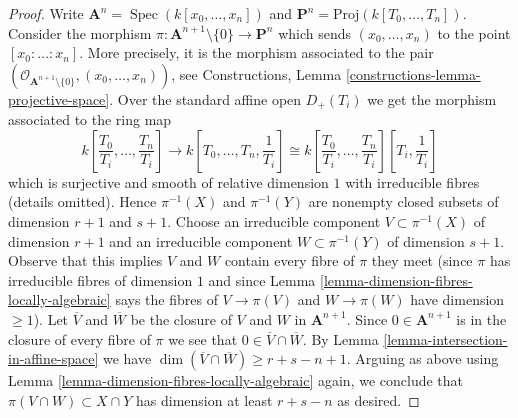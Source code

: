 \documentclass[10pt,a4paper]{amsart}
\theoremstyle{plain}
\theoremstyle{definition}
\theoremstyle{remark}
\numberwithin{equation}{subsection}
\def\Spec{\mathop{\mathrm{Spec}}}
\begin{document}
\begin{proof}
Write $\mathbf{A}^n = \Spec(k[x_0, \ldots, x_n])$ and
$\mathbf{P}^n = \text{Proj}(k[T_0, \ldots, T_n])$.
Consider the morphism
$\pi : \mathbf{A}^{n + 1} \setminus \{0\} \to \mathbf{P}^n$
which sends $(x_0, \ldots, x_n)$ to the point $[x_0 : \ldots : x_n]$.
More precisely, it is the morphism associated to the pair
$(\mathcal{O}_{\mathbf{A}^{n + 1} \setminus \{0\}}, (x_0, \ldots, x_n))$,
see Constructions, Lemma \ref{constructions-lemma-projective-space}.
Over the standard affine open $D_+(T_i)$ we get the morphism
associated to the ring map
$$
k\left[\frac{T_0}{T_i}, \ldots, \frac{T_n}{T_i}\right]
\longrightarrow
k\left[T_0, \ldots, T_n, \frac{1}{T_i}\right] \cong
k\left[\frac{T_0}{T_i}, \ldots, \frac{T_n}{T_i}\right]
\left[T_i, \frac{1}{T_i}\right]
$$
which is surjective and smooth of relative dimension $1$
with irreducible fibres (details omitted).
Hence $\pi^{-1}(X)$ and $\pi^{-1}(Y)$ are nonempty closed subsets of
dimension $r + 1$ and $s + 1$. Choose an irreducible component
$V \subset \pi^{-1}(X)$ of dimension $r + 1$ and an
irreducible component $W \subset \pi^{-1}(Y)$ of dimension $s + 1$.
Observe that this implies $V$ and $W$ contain every fibre of $\pi$
they meet (since $\pi$ has irreducible fibres of dimension $1$
and since Lemma \ref{lemma-dimension-fibres-locally-algebraic}
says the fibres of $V \to \pi(V)$ and $W \to \pi(W)$ have dimension $\geq 1$).
Let $\overline{V}$ and $\overline{W}$ be the closure of
$V$ and $W$ in $\mathbf{A}^{n + 1}$. Since $0 \in \mathbf{A}^{n + 1}$
is in the closure of every fibre of $\pi$ we see that
$0 \in \overline{V} \cap \overline{W}$. By
Lemma \ref{lemma-intersection-in-affine-space}
we have $\dim(\overline{V} \cap \overline{W}) \geq r + s - n + 1$.
Arguing as above using Lemma \ref{lemma-dimension-fibres-locally-algebraic}
again, we conclude that $\pi(V \cap W) \subset X \cap Y$
has dimension at least $r + s - n$ as desired.
\end{proof}
\end{document}
